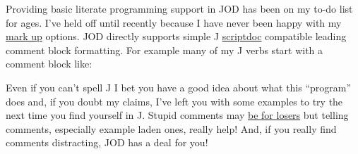 Providing basic literate programming support in JOD has been on my to-do
list for ages. I've held off until recently because I have never been
happy with my \href{http://en.wikipedia.org/wiki/Markup\_language}{mark
up} options. JOD directly supports simple J
\href{http://www.jsoftware.com/help/user/scriptdoc.htm}{scriptdoc}
compatible leading comment block formatting. For example many of my J
verbs start with a comment block like:

\small
\begin{tcolorbox}[breakable, size=fbox, boxrule=1pt, pad at break*=1mm,colback=cellbackground, colframe=cellborder]
\begin{Highlighting}[]
\AlertTok{=:}\OtherTok{:} 


 
 \RegionMarkerTok{((}\FunctionTok{-#}\RegionMarkerTok{)} \RegionMarkerTok{(}\RegionMarkerTok{)}  \RegionMarkerTok{)}   
 \FunctionTok{~:}\OtherTok{/\textbackslash{}} 
\RegionMarkerTok{(}\FunctionTok{#}\RegionMarkerTok{)} \FunctionTok{<}\FunctionTok{#}
\RegionMarkerTok{)}
\end{Highlighting}
\end{tcolorbox}
\normalsize

Even if you can't spell J I bet you have a good idea about what this
``program'' does and, if you doubt my claims, I've left you with some
examples to try the next time you find yourself in J. Stupid comments
may \href{http://php.dzone.com/news/comments-are-losers-2}{be for
losers} but telling comments, especially example laden ones, really
help! And, if you really find comments distracting, JOD has a deal for
you!

